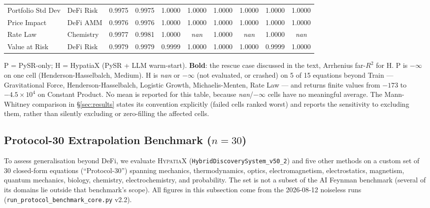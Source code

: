 \documentclass[twoside,11pt]{article}
\begin{document}
\begin{table}[htbp]
{\begin{tabular}{llcccccccc}
Portfolio Std Dev & DeFi Risk & 0.9975 & 0.9975 & 1.0000 & 1.0000 & 1.0000 & 1.0000 & 1.0000 & 1.0000 \\
Price Impact & DeFi AMM & 0.9976 & 0.9976 & 1.0000 & 1.0000 & 1.0000 & 1.0000 & 1.0000 & 1.0000 \\
Rate Law & Chemistry & 0.9977 & 0.9981 & 1.0000 & \textit{nan} & 1.0000 & \textit{nan} & 1.0000 & \textit{nan} \\
Value at Risk & DeFi Risk & 0.9979 & 0.9979 & 0.9999 & 1.0000 & 1.0000 & 1.0000 & 0.9999 & 1.0000 \\
\bottomrule
\end{tabular}%
}%
\par\vspace{4pt}
{\footnotesize\noindent
P = PySR-only; H = HypatiaX (PySR + LLM warm-start). \textbf{Bold}: the rescue case discussed in the text,
Arrhenius far-$R^2$ for H. P is $-\infty$ on one cell (Henderson-Hasselbalch, Medium). H is \textit{nan}
or $-\infty$ (not evaluated, or crashed) on 5 of 15 equations beyond Train ---
Gravitational Force, Henderson-Hasselbalch, Logistic Growth,
Michaelis-Menten, Rate Law --- and returns finite values from $-173$ to
$-4.5\times10^{4}$ on Constant Product. No mean is reported for this table, because
\textit{nan}/$-\infty$ cells have no meaningful average. The Mann-Whitney comparison in
§\ref{sec:results} states its convention explicitly (failed cells ranked worst) and
reports the sensitivity to excluding them, rather than silently excluding or
zero-filling the affected cells.
}
\end{table}

\subsection{Protocol-30 Extrapolation Benchmark ($n=30$)}\label{subsec:feynman-extrapolation-benchmark-n30}
\label{sec:feynman30}

To assess generalisation beyond DeFi, we evaluate \textsc{HypatiaX}
(\texttt{HybridDiscoverySystem\_v50\_2}) and five other methods on a custom set of 30 closed-form
equations (``Protocol-30'') spanning mechanics, thermodynamics, optics, electromagnetism,
electrostatics, magnetism, quantum mechanics, biology, chemistry,
electrochemistry, and probability. The set is not a subset of the AI Feynman
benchmark (several of its domains lie outside that benchmark's scope). All figures in this subsection come from
the 2026-08-12 noiseless runs (\texttt{run\_protocol\_benchmark\_core.py}
v2.2).
\end{document}
